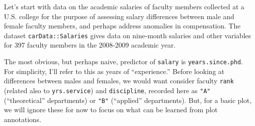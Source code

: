 \documentclass[
  letterpaper,
  10pt,
  krantz2]{krantz}
\makeatletter
\newenvironment{Shaded}{\begin{snugshade}}{\end{snugshade}}
\newcommand{\AttributeTok}[1]{\textcolor[rgb]{0.40,0.45,0.13}{#1}}
\newcommand{\CommentTok}[1]{\textcolor[rgb]{0.37,0.37,0.37}{#1}}
\newcommand{\FunctionTok}[1]{\textcolor[rgb]{0.28,0.35,0.67}{#1}}
\newcommand{\NormalTok}[1]{\textcolor[rgb]{0.00,0.23,0.31}{#1}}
\newcommand{\StringTok}[1]{\textcolor[rgb]{0.13,0.47,0.30}{#1}}
\newenvironment{kframe}{%
  \medskip{}
  \setlength{\fboxsep}{.8em}
  \def\at@end@of@kframe{}%
  \ifinner\ifhmode%
  \def\at@end@of@kframe{\end{minipage}}%
  \begin{minipage}{\columnwidth}%
  \fi\fi%
  \def\FrameCommand##1{\hskip\@totalleftmargin \hskip-\fboxsep
  \colorbox{shadecolor}{##1}\hskip-\fboxsep
      \hskip-\linewidth \hskip-\@totalleftmargin \hskip\columnwidth}%
  \MakeFramed {\advance\hsize-\width
    \@totalleftmargin\z@ \linewidth\hsize
    \@setminipage}}%
{\par\unskip\endMakeFramed%
  \at@end@of@kframe}
\renewenvironment{Shaded}{\begin{kframe}}{\end{kframe}}
\makeatother
\begin{document}
Let's start with data on the academic salaries of faculty members
collected at a U.S. college for the purpose of assessing salary
differences between male and female faculty members, and perhaps address
anomalies in compensation. The dataset \texttt{carData::Salaries} gives
data on nine-month salaries and other variables for 397 faculty members
in the 2008-2009 academic year.

\begin{Shaded}
\end{Shaded}

The most obvious, but perhaps naive, predictor of \texttt{salary} is
\texttt{years.since.phd}. For simplicity, I'll refer to this as years of
``experience.'' Before looking at differences between males and females,
we would want consider faculty \texttt{rank} (related also to
\texttt{yrs.service}) and \texttt{discipline}, recorded here as
\texttt{"A"} (``theoretical'' departments) or \texttt{"B"} (``applied''
departments). But, for a basic plot, we will ignore these for now to
focus on what can be learned from plot annotations.
\end{document}
